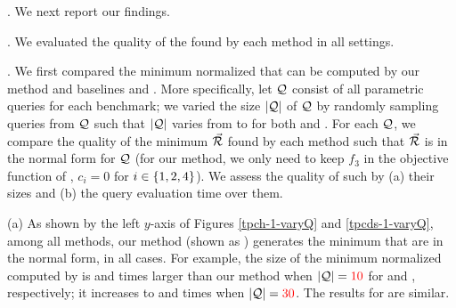 . We next report our findings.










.
We evaluated the quality of the \bdss found by each method in %
all settings. 


. We first compared the minimum
normalized \bdss that can be computed by our method
and baselines \qcssel and \uscsel.
More specifically, 
let $\mathcal Q$ consist of all parametric queries for each benchmark;
we varied the size $|\mathcal Q|$ of $\mathcal Q$ by randomly sampling queries
from $\mathcal Q$ such that $|\mathcal Q|$ varies from  to  for both \tpch and \tpcds. For each $\mathcal Q$, we compare the quality of
the minimum \bds $\vec{{\mathcal R}}$ found by each method such that
$\vec{{\mathcal R}}$ is in the normal form for $\mathcal Q$ (for our method, we
only need to keep $f_{3}$ in the objective function of \opts,
\ie $c_{i} = 0$ for $i\allowbreak\in\allowbreak \{1,\allowbreak 2,\allowbreak 4\}$).
We assess the quality of such \bdss by (a) their sizes and (b) the
query evaluation time over them.

\sstab (a) As shown by the left $y$-axis of Figures
\ref{tpch-1-varyQ} and \ref{tpcds-1-varyQ}, 
among all methods, our method (shown as \opts)
generates the minimum \bdss that are in the normal
form,
in all cases. For example, the size of the
minimum normalized \bds computed by \warn{\uscsel} is
 and  times larger than our method
when $|\mathcal Q| = {\color{red}{10}}$ for \tpch
and \tpcds, respectively; it increases to  and  times when
$|\mathcal Q| = {\color{red}{30}}$.
The results for \qcssel are similar. %


